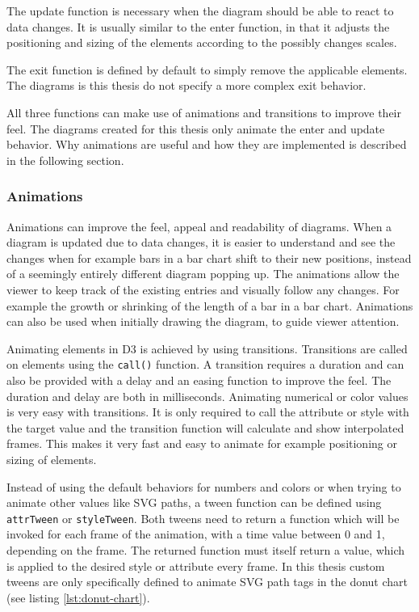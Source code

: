 The update function is necessary when the diagram should be able to react to data changes. It is usually similar to the enter function, in that it adjusts the positioning and sizing of the elements according to the possibly changes scales. 

The exit function is defined by default to simply remove the applicable elements. The diagrams is this thesis do not specify a more complex exit behavior.

All three functions can make use of animations and transitions to improve their feel. The diagrams created for this thesis only animate the enter and update behavior. Why animations are useful and how they are implemented is described in the following section.

\subsubsection{Animations}

Animations can improve the feel, appeal and readability of diagrams. When a diagram is updated due to data changes, it is easier to understand and see the changes when for example bars in a bar chart shift to their new positions, instead of a seemingly entirely different diagram popping up. The animations allow the viewer to keep track of the existing entries and visually follow any changes. For example the growth or shrinking of the length of a bar in a bar chart. Animations can also be used when initially drawing the diagram, to guide viewer attention.

Animating elements in D3 is achieved by using transitions. Transitions are called on elements using the \texttt{call()} function. A transition requires a duration and can also be provided with a delay and an easing function to improve the feel. The duration and delay are both in milliseconds. Animating numerical or color values is very easy with transitions. It is only required to call the attribute or style with the target value and the transition function will calculate and show interpolated frames. This makes it very fast and easy to animate for example positioning or sizing of elements.

Instead of using the default behaviors for numbers and colors or when trying to animate other values like SVG paths, a tween function can be defined using \verb|attrTween| or \verb|styleTween|. Both tweens need to return a function which will be invoked for each frame of the animation, with a time value between 0 and 1, depending on the frame. The returned function must itself return a value, which is applied to the desired style or attribute every frame. In this thesis custom tweens are only specifically defined to animate SVG path tags in the donut chart (see listing \ref{lst:donut-chart}).


